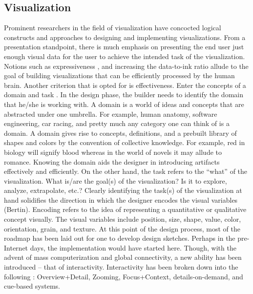 \documentclass[12pt]{article}
\begin{document}
\subsection{Visualization}
Prominent researchers in the field of visualization have concocted logical constructs and approaches to designing and implementing visualizations. From a presentation standpoint, there is much emphasis on presenting the end user just enough visual data for the user to achieve the intended task of the visualization. Notions such as expressiveness \cite{schumann}, and increasing the data-to-ink ratio \cite{tufte} allude to the goal of building visualizations that can be efficiently processed by the human brain. Another criterion that is opted for is effectiveness. Enter the concepts of a domain and task \cite{munzner}. In the design phase, the builder needs to identify the domain that he/she is working with. A domain is a world of ideas and concepts that are abstracted under one umbrella. For example, human anatomy, software engineering, car racing, and pretty much any category one can think of is a domain. A domain gives rise to concepts, definitions, and a prebuilt library of shapes and colors by the convention of collective knowledge. For example, red in biology will signify blood whereas in the world of novels it may allude to romance. Knowing the domain aids the designer in introducing artifacts effectively and efficiently. On the other hand, the task refers to the “what” of the visualization. What is/are the goal(s) of the visualization? Is it to explore, analyze, extrapolate, etc.? Clearly identifying the task(s) of the visualization at hand solidifies the direction in which the designer encodes the visual variables (Bertin). Encoding refers to the idea of representing a quantitative or qualitative concept visually. The visual variables include position, size, shape, value, color, orientation, grain, and texture. At this point of the design process, most of the roadmap has been laid out for one to develop design sketches. Perhaps in the pre-Internet days, the implementation would have started here. Though, with the advent of mass computerization and global connectivity, a new ability has been introduced – that of interactivity. Interactivity has been broken down into the following \cite{cockburn}: Overview+Detail, Zooming, Focus+Context, details-on-demand, and cue-based systems.
\end{document}
